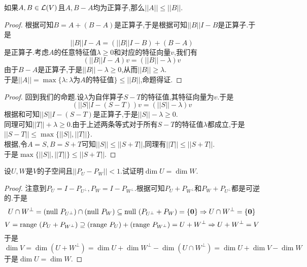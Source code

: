 \documentclass{ctexart}
\begin{document}
\begin{lemma}[Lemma.L.14]
    如果$A,B\in\mathcal{L}(V)$且$A,B-A$均为正算子,那么$||A||\leqslant||B||$.
\end{lemma}
\begin{proof}
    根据可知$B=A+(B-A)$是正算子,于是根据可知$||B||I-B$是正算子.于是
    \[||B||I-A=(||B||I-B)+(B-A)\]
    是正算子.考虑$A$的任意特征值$\lambda\geqslant0$和对应的特征向量$v$,我们有
    \[\left(||B||I-A\right)v=\left(||B||-\lambda\right)v\]
    由于$B-A$是正算子,于是$||B||-\lambda\geqslant0$,从而$||B||\geqslant\lambda$.\\
    于是$||A||=\max\{\lambda:\lambda\text{为}A\text{的特征值}\}\leqslant||B||$,命题得证.
\end{proof}
\begin{proof}
    回到我们的命题.设$\lambda$为自伴算子$S-T$的特征值,其特征向量为$v$.于是
    \[\left(||S||I-(S-T)\right)v=\left(||S||-\lambda\right)v\]
    根据和可知$||S||I-(S-T)$是正算子,于是$||S||-\lambda\geqslant0$.\\
    同理可知$||T||+\lambda\geqslant0$.由于上述两条等式对于所有$S-T$的特征值$\lambda$都成立,于是$||S-T||\leqslant\max\{||S||,||T||\}$.\\
    根据,令$A=S,B=S+T$可知$||S||\leqslant||S+T||$,同理有$||T||\leqslant||S+T||$.\\
    于是$\max\{||S||,||T||\}\leqslant||S+T||$.
\end{proof}
\begin{problem}[14.]
    设$U,W$是$V$的子空间且$||P_U-P_W||<1$.试证明$\dim U=\dim W$.
\end{problem}
\begin{proof}
    注意到$P_U=I-P_{U^\bot},P_W=I-P_{W^\bot}$.根据可知$P_U+P_{W^\bot}$和$P_W+P_{U^\bot}$都是可逆的.于是
    \[U\cap W^\bot=(\text{null } P_{U^{\bot}})\cap(\text{null } P_W)\subseteq\text{null }(P_{U^\bot}+P_W)=\{\mathbf0\}\Rightarrow U\cap W^\bot=\{\mathbf0\}\]
    \[V=\text{range }(P_U+P_{W^\bot})\supseteq(\text{range } P_U)+(\text{range } P_{W^\bot})=U+W^\bot\Rightarrow U+W^\bot=V\]
    于是
    \[\dim V=\dim(U+W^\bot)=\dim U+\dim W^\bot-\dim(U\cap W^\bot)=\dim U+\dim V-\dim W\]
    于是$\dim U=\dim W$.
\end{proof}
\end{document}

